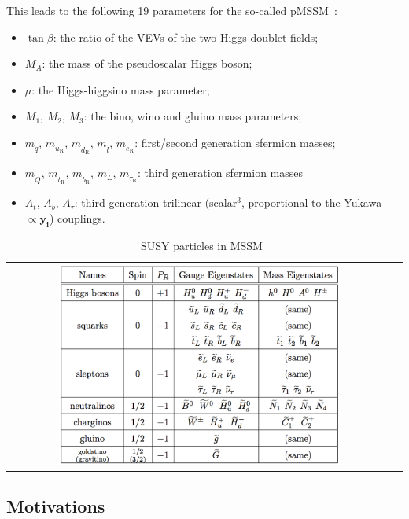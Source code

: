 This leads to the following 19 parameters for the so-called pMSSM~\cite{Djouadi:1998di}:
\begin{itemize}
	\item 
	$\tan\beta$: the ratio of the VEVs of the two-Higgs doublet fields;
	\item
	$M_A$: the mass of the pseudoscalar Higgs boson;
	\item
	$\mu$: the Higgs-higgsino mass parameter;
	\item
	$M_1$, $M_2$, $M_3$: the bino, wino and gluino mass parameters;
	\item
	$m_{\widetilde{q}}$, $m_{\widetilde{u}_{\mathrm{R}}}$, $m_{\widetilde{d}_{\mathrm{R}}}$,  $m_{\widetilde{l}}$,  $m_{\widetilde{e}_{\mathrm{R}}}$: first/second generation sfermion masses;
	\item
	$m_{\widetilde{Q}}$, $m_{\widetilde{t}_{\mathrm{R}}}$, $m_{\widetilde{b}_{\mathrm{R}}}$, $m_{L}$, $m_{\widetilde{\tau}_{\mathrm{R}}}$: third generation sfermion masses
	\item
	$A_t$, $A_b$, $A_{\tau}$: third generation trilinear (scalar$^3$, proportional to the Yukawa $\propto \mathbf{y_i}$) couplings.
\end{itemize}

\begin{table}
		\centering
		\begin{tabular}{cc}
			\includegraphics[width=0.75\textwidth]{theory/pics/SUSY_particles_table.png}
		\end{tabular}
		\caption{SUSY particles in MSSM~\protect\cite{Martin:1997ns}}
		\label{fig:SUSY_particles_table}
\end{table}

\FloatBarrier

\subsection{Motivations}

